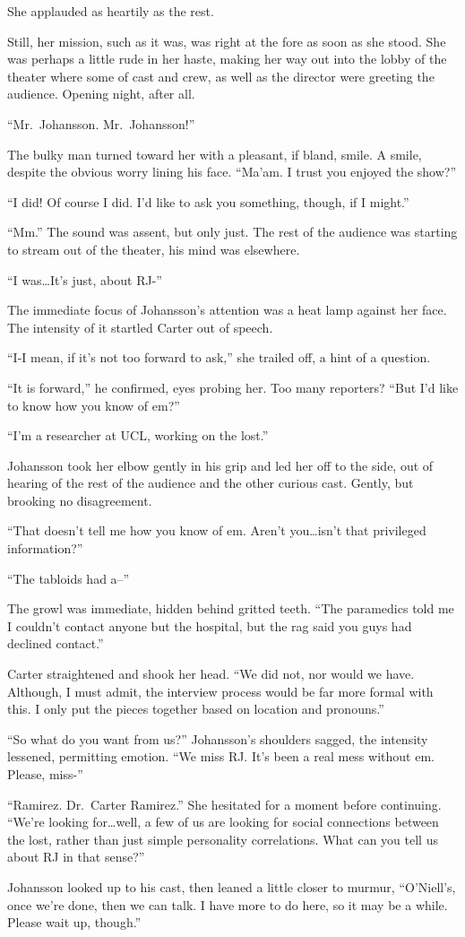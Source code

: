 She applauded as heartily as the rest.

Still, her mission, such as it was, was right at the fore as soon as she stood. She was perhaps a little rude in her haste, making her way out into the lobby of the theater where some of cast and crew, as well as the director were greeting the audience. Opening night, after all.

``Mr.~Johansson. Mr.~Johansson!''

The bulky man turned toward her with a pleasant, if bland, smile. A smile, despite the obvious worry lining his face. ``Ma'am. I trust you enjoyed the show?''

``I did! Of course I did. I'd like to ask you something, though, if I might.''

``Mm.'' The sound was assent, but only just. The rest of the audience was starting to stream out of the theater, his mind was elsewhere.

``I was\ldots{}It's just, about RJ-''

The immediate focus of Johansson's attention was a heat lamp against her face. The intensity of it startled Carter out of speech.

``I-I mean, if it's not too forward to ask,'' she trailed off, a hint of a question.

``It is forward,'' he confirmed, eyes probing her. Too many reporters? ``But I'd like to know how you know of em?''

``I'm a researcher at UCL, working on the lost.''

Johansson took her elbow gently in his grip and led her off to the side, out of hearing of the rest of the audience and the other curious cast. Gently, but brooking no disagreement.

``That doesn't tell me how you know of em. Aren't you\ldots{}isn't that privileged information?''

``The tabloids had a--''

The growl was immediate, hidden behind gritted teeth. ``The paramedics told me I couldn't contact anyone but the hospital, but the rag said you guys had declined contact.''

Carter straightened and shook her head. ``We did not, nor would we have. Although, I must admit, the interview process would be far more formal with this. I only put the pieces together based on location and pronouns.''

``So what do you want from us?'' Johansson's shoulders sagged, the intensity lessened, permitting emotion. ``We miss RJ. It's been a real mess without em. Please, miss-''

``Ramirez. Dr.~Carter Ramirez.'' She hesitated for a moment before continuing. ``We're looking for\ldots{}well, a few of us are looking for social connections between the lost, rather than just simple personality correlations. What can you tell us about RJ in that sense?''

Johansson looked up to his cast, then leaned a little closer to murmur, ``O'Niell's, once we're done, then we can talk. I have more to do here, so it may be a while. Please wait up, though.''
